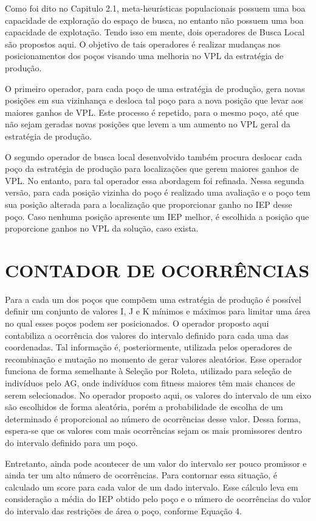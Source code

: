 Como foi dito no Capitulo 2.1, meta-heurísticas populacionais possuem uma boa capacidade de exploração do espaço de busca, no entanto não possuem uma boa capacidade de explotação. Tendo isso em mente, dois operadores de Busca Local são propostos aqui. O objetivo de tais operadores é realizar mudanças nos posicionamentos dos poços visando uma melhoria no VPL da estratégia de produção.

O primeiro operador, para cada poço de uma estratégia de produção, gera novas posições em sua vizinhança e desloca tal poço para a nova posição que levar aos maiores ganhos de VPL. Este processo é repetido, para o mesmo poço, até que não sejam geradas novas posições que levem a um aumento no VPL geral da estratégia de produção.

O segundo operador de busca local desenvolvido também procura deslocar cada poço da estratégia de produção para localizações que gerem maiores ganhos de VPL. No entanto, para tal operador essa abordagem foi refinada. Nessa segunda versão, para cada posição vizinha do poço é realizado uma avaliação e o poço tem sua posição alterada para a localização que proporcionar ganho no IEP desse poço. Caso nenhuma posição apresente um IEP melhor, é escolhida a posição que proporcione ganhos no VPL da solução, caso exista. 

\section{CONTADOR DE OCORRÊNCIAS}
  
Para a cada um dos poços que compõem uma estratégia de produção é possível definir um conjunto de valores I, J e K mínimos e máximos para limitar uma área no qual esses poços podem ser posicionados. O operador proposto aqui contabiliza a ocorrência dos valores do intervalo definido para cada uma das coordenadas. Tal informação é, posteriormente, utilizada pelos operadores de recombinação e mutação no momento de gerar valores aleatórios. Esse operador funciona de forma semelhante à Seleção por Roleta, utilizado para seleção de indivíduos pelo AG, onde indivíduos com fitness maiores têm mais chances de serem selecionados. No operador proposto aqui, os valores do intervalo de um eixo são escolhidos de forma aleatória, porém a probabilidade de escolha de um determinado é proporcional ao número de ocorrências desse valor. Dessa forma, espera-se que os valores com mais ocorrências sejam os mais promissores dentro do intervalo definido para um poço.

Entretanto, ainda pode acontecer de um valor do intervalo ser pouco promissor e ainda ter um alto número de ocorrências. Para contornar essa situação, é calculado um score para cada valor de um dado intervalo. Esse cálculo leva em consideração a média do IEP obtido pelo poço e o número de ocorrências do valor do intervalo das restrições de área o poço, conforme Equação 4.


